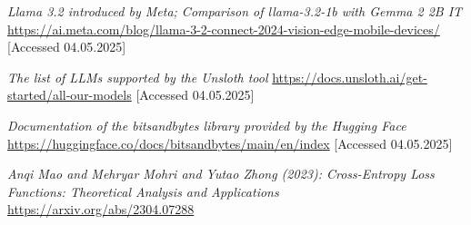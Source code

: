 \documentclass[licencjacka,en]{pracamgr}
\begin{document}
\begin{thebibliography}{199}
\textit{Llama 3.2 introduced by Meta; Comparison of llama-3.2-1b with Gemma 2 2B IT}
\url{https://ai.meta.com/blog/llama-3-2-connect-2024-vision-edge-mobile-devices/}
[Accessed 04.05.2025]

\textit{The list of LLMs supported by the Unsloth tool}
\url{https://docs.unsloth.ai/get-started/all-our-models}
[Accessed 04.05.2025]

\textit{Documentation of the bitsandbytes library provided by the Hugging Face}
\url{https://huggingface.co/docs/bitsandbytes/main/en/index}
[Accessed 04.05.2025]

\textit{Anqi Mao and Mehryar Mohri and Yutao Zhong (2023): Cross-Entropy Loss Functions: Theoretical Analysis and Applications}
\url{https://arxiv.org/abs/2304.07288}


\end{thebibliography}
\end{document}
